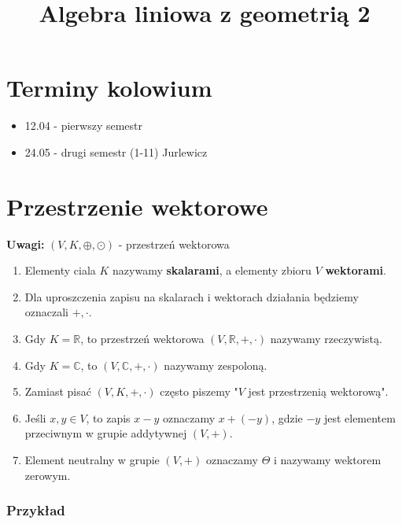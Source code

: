 \documentclass[a5paper,8pt]{article}
\title{Algebra liniowa z geometrią 2}
\date{}
\begin{document}
    \maketitle

    \section{Terminy kolowium}

    \begin{itemize}
        \item 12.04 - pierwszy semestr
        \item 24.05 - drugi semestr (1-11) Jurlewicz
    \end{itemize}

    \section{Przestrzenie wektorowe} %
    \label{sec:przestrzenie_wektorowe}

    \large{\textbf{Uwagi:   }}
    $ (V, K, \oplus, \odot) $ - przestrzeń wektorowa

    \begin{enumerate}
        \item Elementy ciala $K$ nazywamy \textbf{skalarami}, a elementy zbioru $V$ \textbf{wektorami}.
        \item Dla uproszczenia zapisu na skalarach i wektorach działania będziemy oznaczali $ +, \cdot $.
        \item Gdy $ K = \mathbb{R} $, to przestrzeń wektorowa $ (V, \mathbb{R}, +, \cdot) $ nazywamy rzeczywistą.
        \item Gdy $ K = \mathbb{C} $, to $ (V, \mathbb{C}, +, \cdot) $ nazywamy zespoloną.
        \item Zamiast pisać $ (V, K, +, \cdot) $ często piszemy "$V$ jest przestrzenią wektorową".
        \item Jeśli $ x, y \in V $, to zapis $x-y$ oznaczamy $x + (-y)$, gdzie $-y$ jest elementem przeciwnym w grupie addytywnej $(V, +)$.
        \item Element neutralny w grupie $(V, +)$ oznaczamy $\Theta$ i nazywamy wektorem zerowym.
    \end{enumerate}

    \subsubsection{Przykład} %
    \label{ssub:przyklad_1}
    
\end{document}
